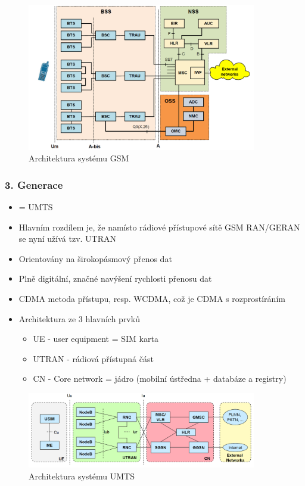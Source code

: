 \documentclass[10pt,a4paper]{article}
\begin{document}
\begin{figure}[ht]
    \centering
    \includegraphics[width=10cm]{gsmArchitektura.png}
    \caption{Architektura systému GSM}
    \label{fig:gsmArchitektura}
\end{figure}

\subsubsection{3. Generace}

\begin{itemize}
\item = UMTS
\item Hlavním rozdílem je, že namísto rádiové přístupové sítě GSM RAN/GERAN se nyní užívá tzv. UTRAN
\item Orientovány na širokopásmový přenos dat
\item Plně digitální, značné navýšení rychlosti přenosu dat
\item CDMA metoda přístupu, resp. WCDMA, což je CDMA s rozprostíráním
\item Architektura ze 3 hlavních prvků
\begin{itemize}
\item UE - user equipment = SIM karta
\item UTRAN - rádiová přístupná část
\item CN - Core network = jádro (mobilní ústředna + databáze a registry)
\end{itemize}
\end{itemize}
\begin{figure}[ht]
    \centering
    \includegraphics[width=10cm]{umtsArchitektura.png}
    \caption{Architektura systému UMTS}
    \label{fig:umtsArchitektura}
\end{figure}
\end{document}

